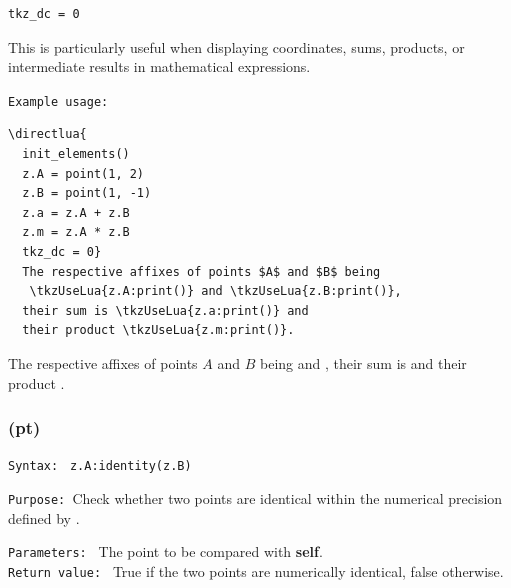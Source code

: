 \begin{verbatim}
tkz_dc = 0
\end{verbatim}

\medskip

This is particularly useful when displaying coordinates, sums, products, or intermediate results in mathematical expressions.

\medskip
\texttt{Example usage:}

\begin{verbatim}
\directlua{
  init_elements()
  z.A = point(1, 2)
  z.B = point(1, -1)
  z.a = z.A + z.B
  z.m = z.A * z.B
  tkz_dc = 0}
  The respective affixes of points $A$ and $B$ being
   \tkzUseLua{z.A:print()} and \tkzUseLua{z.B:print()},
  their sum is \tkzUseLua{z.a:print()} and
  their product \tkzUseLua{z.m:print()}.
\end{verbatim}


The respective affixes of points $A$ and $B$ being
    and ,
  their sum is  and
  their product .

  \subsubsection{(pt)}
  \label{ssub:identity}

  \medskip
  \texttt{Syntax: } \verb|z.A:identity(z.B)|

  \medskip
  \texttt{Purpose: }Check whether two points are identical within the numerical precision defined by .

  \medskip
  \texttt{Parameters: } The point to be compared with \textbf{self}.\\

  \medskip
  \texttt{Return value: } True if the two points are numerically identical, false otherwise.\\


  \begin{tkzexample}[latex=.5\textwidth]
  \end{tkzexample}

